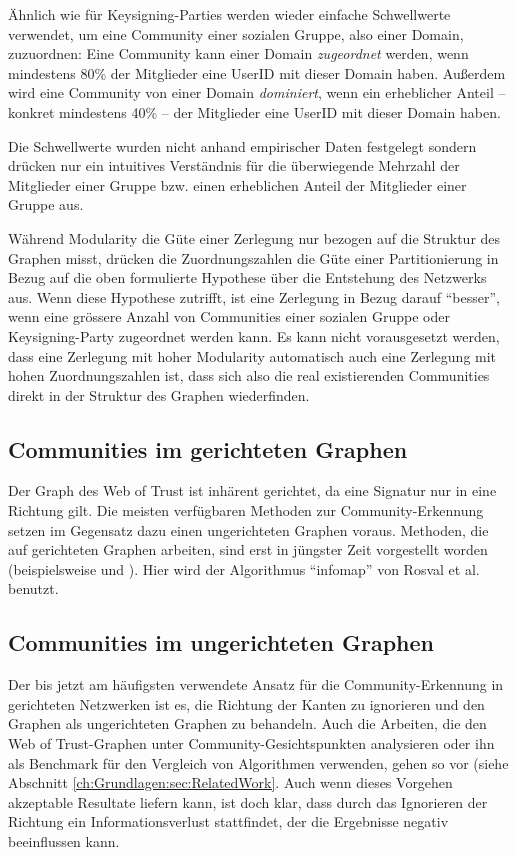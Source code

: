 Ähnlich wie für Keysigning-Parties werden wieder einfache
Schwellwerte verwendet, um eine Community einer sozialen Gruppe, also
einer Domain, zuzuordnen: Eine Community kann einer Domain
\emph{zugeordnet} werden, wenn mindestens 80\% der Mitglieder
eine UserID mit dieser Domain haben. Außerdem wird eine Community von
einer Domain \emph{dominiert}, wenn ein erheblicher Anteil -- konkret
mindestens 40\% -- der Mitglieder eine UserID mit dieser Domain haben.

Die Schwellwerte wurden nicht anhand empirischer Daten festgelegt
sondern drücken nur ein intuitives Verständnis für die
überwiegende Mehrzahl der Mitglieder einer Gruppe bzw. einen
erheblichen Anteil der Mitglieder einer Gruppe aus.

Während Modularity die Güte einer Zerlegung nur bezogen auf die
Struktur des Graphen misst, drücken die Zuordnungszahlen die Güte
einer Partitionierung in Bezug auf die oben formulierte Hypothese
über die Entstehung des Netzwerks aus. Wenn diese Hypothese
zutrifft, ist eine Zerlegung in Bezug darauf ``besser'', wenn eine
grössere Anzahl von Communities einer sozialen Gruppe oder
Keysigning-Party zugeordnet werden kann. Es kann nicht vorausgesetzt
werden, dass eine Zerlegung mit hoher Modularity automatisch auch eine
Zerlegung mit hohen Zuordnungszahlen ist, dass sich also die real
existierenden Communities direkt in der Struktur des Graphen
wiederfinden.

\subsection{Communities im gerichteten Graphen}
\label{sec:comm-gericht-graph}
Der Graph des Web of Trust ist inhärent gerichtet, da eine Signatur
nur in eine Richtung gilt. Die meisten verfügbaren Methoden zur
Community-Erkennung setzen im Gegensatz dazu einen ungerichteten
Graphen voraus. Methoden, die auf gerichteten Graphen arbeiten, sind
erst in jüngster Zeit vorgestellt worden (beispielsweise
\cite{Leicht2008} und \cite{Rosvall2008}). Hier wird der Algorithmus
``infomap'' von Rosval et al. \cite{Rosvall2008} benutzt. 

\subsection{Communities im ungerichteten Graphen}
\label{sec:comm-unger-graph}


Der bis jetzt am häufigsten verwendete Ansatz für die
Community-Erkennung in gerichteten Netzwerken ist es, die Richtung der
Kanten zu ignorieren und den Graphen als ungerichteten Graphen zu
behandeln. Auch die Arbeiten, die den Web of Trust-Graphen unter
Community-Gesichtspunkten analysieren oder ihn als Benchmark für den
Vergleich von Algorithmen verwenden, gehen so vor (siehe Abschnitt
\ref{ch:Grundlagen:sec:RelatedWork}. Auch wenn dieses Vorgehen akzeptable Resultate
liefern kann, ist doch klar, dass durch das Ignorieren der Richtung
ein Informationsverlust stattfindet, der die Ergebnisse negativ
beeinflussen kann.

